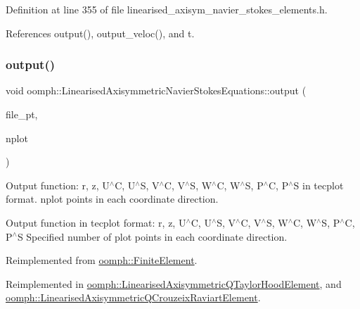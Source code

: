 Definition at line 355 of file linearised\+\_\+axisym\+\_\+navier\+\_\+stokes\+\_\+elements.\+h.



References output(), output\+\_\+veloc(), and t.

\mbox{\label{classoomph_1_1LinearisedAxisymmetricNavierStokesEquations_a19ee5f4d8f6e187300f135b3eb69d194}} 
\subsubsection{\texorpdfstring{output()}{output()}\hspace{0.1cm}{\footnotesize\ttfamily [4/4]}}
{\footnotesize\ttfamily void oomph\+::\+Linearised\+Axisymmetric\+Navier\+Stokes\+Equations\+::output (\begin{DoxyParamCaption}\item[{F\+I\+LE $\ast$}]{file\+\_\+pt,  }\item[{const unsigned \&}]{nplot }\end{DoxyParamCaption})\hspace{0.3cm}{\ttfamily [virtual]}}



Output function\+: r, z, U$^\wedge$C, U$^\wedge$S, V$^\wedge$C, V$^\wedge$S, W$^\wedge$C, W$^\wedge$S, P$^\wedge$C, P$^\wedge$S in tecplot format. nplot points in each coordinate direction. 

Output function in tecplot format\+: r, z, U$^\wedge$C, U$^\wedge$S, V$^\wedge$C, V$^\wedge$S, W$^\wedge$C, W$^\wedge$S, P$^\wedge$C, P$^\wedge$S Specified number of plot points in each coordinate direction. 

Reimplemented from \hyperlink{classoomph_1_1FiniteElement_adfaee690bb0608f03320eeb9d110d48c}{oomph\+::\+Finite\+Element}.



Reimplemented in \hyperlink{classoomph_1_1LinearisedAxisymmetricQTaylorHoodElement_ad3c9effcb6919a0d639e50a89c91323d}{oomph\+::\+Linearised\+Axisymmetric\+Q\+Taylor\+Hood\+Element}, and \hyperlink{classoomph_1_1LinearisedAxisymmetricQCrouzeixRaviartElement_a72a580ae5281b5e5d88e656194cbf7b1}{oomph\+::\+Linearised\+Axisymmetric\+Q\+Crouzeix\+Raviart\+Element}.



